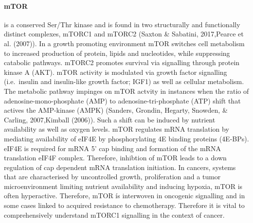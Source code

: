 \documentclass[12pt,openany]{book}
\begin{document}
\paragraph{mTOR} \label{mTOR}

is a conserved Ser/Thr kinase and is found in two structurally and
functionally distinct complexes, mTORC1 and mTORC2 (Saxton \& Sabatini,
2017,Pearce et al. (2007)). In a growth promoting environment mTOR
switches cell metabolism to increased production of protein, lipids and
nucleotides, while suppressing catabolic pathways. mTORC2 promotes
survival via signalling through protein kinase A (AKT). mTOR activity is
modulated via growth factor signalling (i.e.~insulin and insulin-like
growth factor; IGF1) as well as cellular metabolism. The metabolic
pathway impinges on mTOR actvity in instances when the ratio of
adenosine-mono-phosphate (AMP) to adenosine-tri-phosphate (ATP) shift
that actives the AMP-kinase (AMPK) (Sanders, Grondin, Hegarty, Snowden,
\& Carling, 2007,Kimball (2006)). Such a shift can be induced by
nutrient availability as well as oxygen levels. mTOR regulates mRNA
translation by mediating availability of eIF4E by phosphorylating 4E
binding proteins (4E-BPs). eIF4E is required for mRNA 5' cap binding and
formation of the mRNA translation eIF4F complex. Therefore, inhibtion of
mTOR leads to a down regulation of cap dependent mRNA translation
initiation. In cancers, systems that are characterised by uncontrolled
growth, proliferation and a tumor microenvironment limiting nutrient
availability and inducing hypoxia, mTOR is often hyperactive. Therefore,
mTOR ís interwoven in oncogenic signalling and in some cases linked to
acquired resistance to chemotherapy. Therefore it is vital to
comprehensively understand mTORC1 signalling in the context of cancer.
\clearpage
\end{document}
